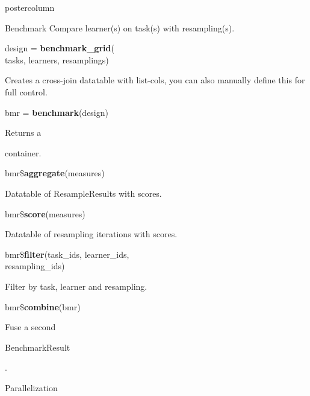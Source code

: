 \documentclass{beamer}
\newlength{\columnheight} %
\newcommand{\codeinline}[1]{\begin{codeboxinline}#1\end{codeboxinline}}
\begin{document}
\begin{withoutheader}
\begin{frame}[fragile]{}
\begin{columns}
		\begin{column}{.245\textwidth}
			\begin{beamercolorbox}[center]{postercolumn}
				\begin{minipage}{.98\textwidth}
					\parbox[t][\columnheight]{\textwidth}{
						\begin{myblock}{Benchmark}
                            Compare learner(s) on task(s) with resampling(s).
						\\
						\begin{codeboxmultiline}[width=19.4cm]
							design = \textbf{benchmark\_grid}(\\
							\hspace*{1ex}tasks, learners, resamplings)
						\end{codeboxmultiline}
						Creates a cross-join datatable with list-cols, you can also manually define this for full control.
						\\
						\begin{codebox}
							bmr = \textbf{benchmark}(design)
						\end{codebox}
						Returns a \codeinline{}
						container.
						\\
						\begin{codebox}
							bmr\$\textbf{aggregate}(measures)
						\end{codebox}
						Datatable of ResampleResults with scores.
						\\
						\begin{codebox}
							bmr\$\textbf{score}(measures)
						\end{codebox}
						Datatable of resampling iterations with scores. 
						\\
						\begin{codeboxmultiline}[width=21.5cm]
							bmr\$\textbf{filter}(task\_ids, learner\_ids,\\ 
							\hspace*{1ex}resampling\_ids)
						\end{codeboxmultiline}
						Filter by task, learner and resampling. 
						\\
						\begin{codebox}
							bmr\$\textbf{combine}(bmr)
						\end{codebox}
						Fuse a second \codeinline{BenchmarkResult}. 
					\end{myblock}
					\begin{myblock}{Parallelization}

\end{myblock}}
\end{minipage}
\end{beamercolorbox}
\end{column}
\end{columns}
\end{frame}
\end{withoutheader}
\end{document}
